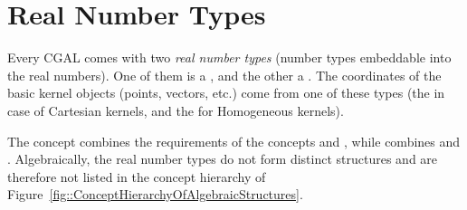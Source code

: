 \section{Real Number Types}
Every CGAL  comes with two \emph{real number types}
(number types embeddable into the real numbers). One of them is a
, and the other a .  The
coordinates of the basic kernel objects (points, vectors, etc.) come
from one of these types (the  in case of Cartesian
kernels, and the  for Homogeneous kernels). 

The concept  combines the requirements of the
concepts  and , while
 combines  and
. Algebraically, the real number types do not form
distinct structures and are therefore not listed in the concept
hierarchy of Figure~\ref{fig::ConceptHierarchyOfAlgebraicStructures}.
